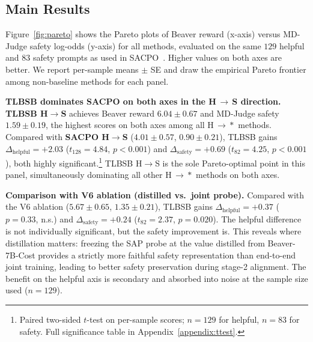 
\subsection{Main Results}
\label{sec:main-results}

Figure~\ref{fig:pareto} shows the Pareto plots of Beaver reward (x-axis) versus
MD-Judge safety log-odds (y-axis) for all methods, evaluated on the same
$129$ helpful and $83$ safety prompts as used in SACPO~\citep{sacpo}.
Higher values on both axes are better.
We report per-sample means $\pm$ SE and draw the empirical Pareto frontier
among non-baseline methods for each panel.

\textbf{TLBSB dominates SACPO on both axes in the H$\,\to\,$S direction.}
%
\textbf{TLBSB H$\to$S} achieves Beaver reward $6.04 \pm 0.67$ and MD-Judge safety
$1.59 \pm 0.19$, the highest scores on both axes among all H$\,\to\!*$ methods.
Compared with \textbf{SACPO H$\to$S} ($4.01 \pm 0.57$, $0.90 \pm 0.21$),
TLBSB gains $\Delta_{\mathrm{helpful}} = +2.03$ ($t_{128}=4.84$, $p<0.001$) and
$\Delta_{\mathrm{safety}} = +0.69$ ($t_{82}=4.25$, $p<0.001$), both highly
significant.\footnote{%
  Paired two-sided $t$-test on per-sample scores;
  $n=129$ for helpful, $n=83$ for safety.
  Full significance table in Appendix~\ref{appendix:ttest}.}
TLBSB H$\to$S is the sole Pareto-optimal point in this panel,
simultaneously dominating all other H$\,\to\!*$ methods on both axes.

\textbf{Comparison with V6 ablation (distilled vs.\ joint probe).}
%
Compared with the V6 ablation ($5.67 \pm 0.65$, $1.35 \pm 0.21$),
TLBSB gains $\Delta_{\mathrm{helpful}} = +0.37$ ($p = 0.33$, n.s.) and
$\Delta_{\mathrm{safety}} = +0.24$ ($t_{82}=2.37$, $p = 0.020$).
The helpful difference is not individually significant, but the safety
improvement is.
This reveals where distillation matters: freezing the SAP probe at the value
distilled from Beaver-7B-Cost provides a strictly more faithful safety
representation than end-to-end joint training, leading to better safety
preservation during stage-2 alignment.
The benefit on the helpful axis is secondary and absorbed into noise at the
sample size used ($n=129$).

